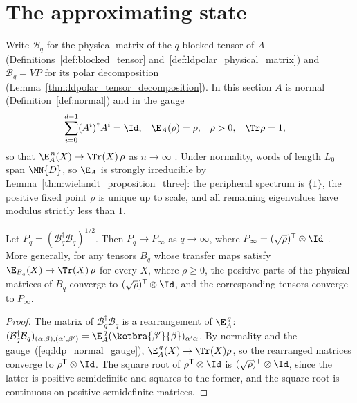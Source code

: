 


\section{The approximating state}

Write $\mathcal B_q$ for the physical matrix of the $q$-blocked tensor of $A$
(Definitions~\ref{def:blocked_tensor} and~\ref{def:ldpolar_physical_matrix})
and $\mathcal B_q=VP$ for its polar decomposition
(Lemma~\ref{thm:ldpolar_tensor_decomposition}).
In this section $A$ is normal (Definition~\ref{def:normal}) and in the gauge
\begin{align}
    \sum_{i=0}^{d-1}(A^i)^\dagger A^i
     & =\Id,
     &
    \E_A(\rho)
     & =\rho,
     &
    \rho
     & >0,
     &
    \Tr\rho
     & =1,
    \label{eq:ldp_normal_gauge}
\end{align}
so that $\E_A^{\,n}(X)\to\Tr(X)\,\rho$ as $n\to\infty$
\cite[eq.~(5)]{Malz2024Preparation}. Under normality, words of length $L_0$
span $\MN{D}$, so $\E_A$ is strongly irreducible by
Lemma~\ref{thm:wielandt_proposition_three}: the peripheral spectrum is
$\{1\}$, the positive fixed point $\rho$ is unique up to scale, and all
remaining eigenvalues have modulus strictly less than $1$.

\begin{lemma}
    \label{thm:ldp_positive_part_converges}
    \leanok
    Let $P_q=(\mathcal B_q^\dagger\mathcal B_q)^{1/2}$. Then $P_q\to P_\infty$ as
    $q\to\infty$, where $P_\infty=(\sqrt\rho)^{\mathsf T}\otimes\Id$
    \cite[eq.~(8)]{Malz2024Preparation}.
    More generally, for any tensors $B_q$ whose transfer maps satisfy
    $\E_{B_q}(X)\to\Tr(X)\,\rho$ for every $X$, where $\rho\ge0$, the positive
    parts of the physical matrices of $B_q$ converge to
    $(\sqrt\rho)^{\mathsf T}\otimes\Id$, and the corresponding tensors
    converge to $P_\infty$.
\end{lemma}
\begin{proof}
    \leanok
    The matrix of $\mathcal B_q^\dagger\mathcal B_q$ is a rearrangement of
    $\E_A^{\,q}$:
    $(\mathcal B_q^\dagger\mathcal B_q)_{(\alpha,\beta),(\alpha',\beta')}
        =\E_A^{\,q}(\ketbra{\beta'}{\beta})_{\alpha'\alpha}$.
    By normality and the gauge~(\ref{eq:ldp_normal_gauge}),
    $\E_A^{\,q}(X)\to\Tr(X)\rho$, so the rearranged matrices converge to
    $\rho^{\mathsf T}\otimes\Id$. The square root of
    $\rho^{\mathsf T}\otimes\Id$ is $(\sqrt\rho)^{\mathsf T}\otimes\Id$,
    since the latter is positive semidefinite and squares to the former, and
    the square root is continuous on positive semidefinite matrices.
\end{proof}

